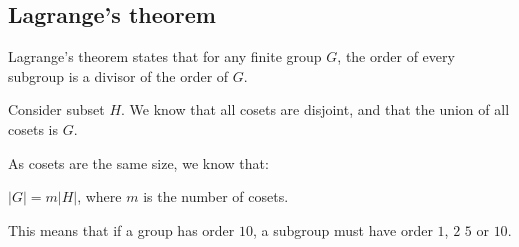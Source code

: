 
\subsection{Lagrange's theorem}

Lagrange's theorem states that for any finite group \(G\), the order of every subgroup is a divisor of the order of \(G\).

Consider subset \(H\). We know that all cosets are disjoint, and that the union of all cosets is \(G\).

As cosets are the same size, we know that:

\(|G|=m|H|\), where \(m\) is the number of cosets.

This means that if a group has order \(10\), a subgroup must have order \(1\), \(2\) \(5\) or \(10\).

